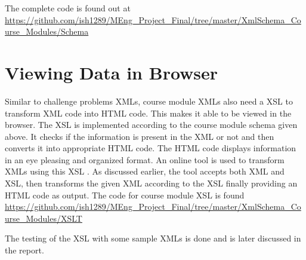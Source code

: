 \documentclass[11pt,letterpaper]{report}
\begin{document}
The complete code is found out at \url{https://github.com/ish1289/MEng_Project_Final/tree/master/XmlSchema_Course_Modules/Schema}

 

\section{Viewing Data in Browser}
Similar to challenge problems XMLs, course module XMLs also need a XSL to transform XML code into HTML code. This makes it able to be viewed in the browser. The XSL is implemented according to the course module schema given above. It checks if the information is present in the XML or not and then converts it into appropriate HTML code. The HTML code displays information in an eye pleasing and organized format. An online tool is used to transform XMLs using this XSL \cite{olXSL}. As discussed earlier, the tool accepts both XML and XSL, then transforms the given XML according to the XSL finally providing an HTML code as output. The code for course module XSL is found \url{https://github.com/ish1289/MEng_Project_Final/tree/master/XmlSchema_Course_Modules/XSLT}

\bigskip

The testing of the XSL with some sample XMLs is done and is later discussed in the report. 
\end{document}
